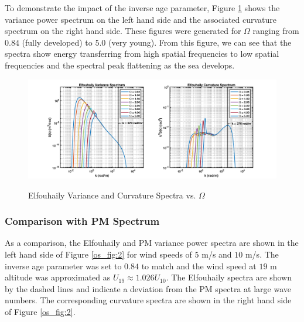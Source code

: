 To demonstrate the impact of the inverse age parameter, Figure \ref{os_fig:3a} shows the variance power spectrum on the left hand side and the associated curvature spectrum on the right hand side. These figures were generated for $\Omega$ ranging from $0.84$ (fully developed) to $5.0$ (very young). From this figure, we can see that the spectra show energy transferring from high spatial frequencies to low spatial frequencies and the spectral peak flattening as the sea develops.

\begin{figure}[H]
  \begin{center}
\includegraphics[width=6in]{../media/Ocean_Surface/elf_variance_curvature_spectrum_age.png}
  \end{center}
  \renewcommand{\baselinestretch}{1} \small\normalsize
  \begin{quote}
    \caption[Elfouhaily Variance and Curvature Spectra vs. $\Omega$]{Elfouhaily Variance and Curvature Spectra vs. $\Omega$ \label{os_fig:3a}}
  \end{quote}
\end{figure}
\renewcommand{\baselinestretch}{2} \small\normalsize

\subsubsection {Comparison with PM Spectrum}
As a comparison, the Elfouhaily and PM variance power spectra are shown in the left hand side of Figure \ref{os_fig:2} for wind speeds of $5$ m/s and $10$ m/s. The inverse age parameter was set to $0.84$ to match and the wind speed at $19$ m altitude was approximated as $U_{19} \approx 1.026 U_{10}$. The Elfouhaily spectra are shown by the dashed lines and indicate a deviation from the PM spectra at large wave numbers. The corresponding curvature spectra are shown in the right hand side of Figure \ref{os_fig:2}.
 
